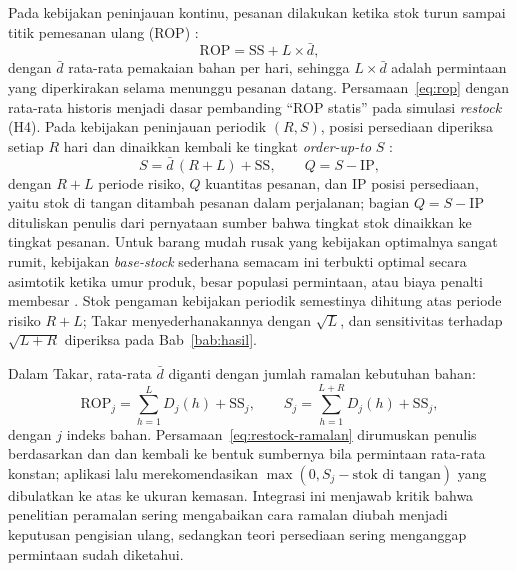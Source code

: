 Pada kebijakan peninjauan kontinu, pesanan dilakukan ketika stok turun sampai titik pemesanan ulang (ROP) \citep*{taufiq2025implementation}:
\begin{equation}
\mathrm{ROP} = \mathrm{SS} + L \times \bar{d},
\label{eq:rop}
\end{equation}
dengan $\bar{d}$ rata-rata pemakaian bahan per hari, sehingga $L \times \bar{d}$ adalah permintaan yang diperkirakan selama menunggu pesanan datang. Persamaan~\eqref{eq:rop} dengan rata-rata historis menjadi dasar pembanding ``ROP statis'' pada simulasi \textit{restock} (H4). Pada kebijakan peninjauan periodik $(R, S)$, posisi persediaan diperiksa setiap $R$ hari dan dinaikkan kembali ke tingkat \textit{order-up-to} $S$ \citep*{yigit2023novel}:
\begin{equation}
S = \bar{d}\,(R + L) + \mathrm{SS}, \qquad Q = S - \mathrm{IP},
\label{eq:order-up-to}
\end{equation}
dengan $R + L$ periode risiko, $Q$ kuantitas pesanan, dan IP posisi persediaan, yaitu stok di tangan ditambah pesanan dalam perjalanan; bagian $Q = S - \mathrm{IP}$ dituliskan penulis dari pernyataan sumber bahwa tingkat stok dinaikkan ke tingkat pesanan. Untuk barang mudah rusak yang kebijakan optimalnya sangat rumit, kebijakan \textit{base-stock} sederhana semacam ini terbukti optimal secara asimtotik ketika umur produk, besar populasi permintaan, atau biaya penalti membesar \citep*{bu2023asymptotic}. Stok pengaman kebijakan periodik semestinya dihitung atas periode risiko $R + L$; Takar menyederhanakannya dengan $\sqrt{L}$, dan sensitivitas terhadap $\sqrt{L + R}$ diperiksa pada Bab~\ref{bab:hasil}.

Dalam Takar, rata-rata $\bar{d}$ diganti dengan jumlah ramalan kebutuhan bahan:
\begin{equation}
\mathrm{ROP}_j = \sum_{h=1}^{L} D_j(h) + \mathrm{SS}_j, \qquad S_j = \sum_{h=1}^{L+R} D_j(h) + \mathrm{SS}_j,
\label{eq:restock-ramalan}
\end{equation}
dengan $j$ indeks bahan. Persamaan~\eqref{eq:restock-ramalan} dirumuskan penulis berdasarkan \citet*{taufiq2025implementation} dan \citet*{yigit2023novel} dan kembali ke bentuk sumbernya bila permintaan rata-rata konstan; aplikasi lalu merekomendasikan $\max(0, S_j - \text{stok di tangan})$ yang dibulatkan ke atas ke ukuran kemasan. Integrasi ini menjawab kritik \citet*{goltsos2022inventory} bahwa penelitian peramalan sering mengabaikan cara ramalan diubah menjadi keputusan pengisian ulang, sedangkan teori persediaan sering menganggap permintaan sudah diketahui.

